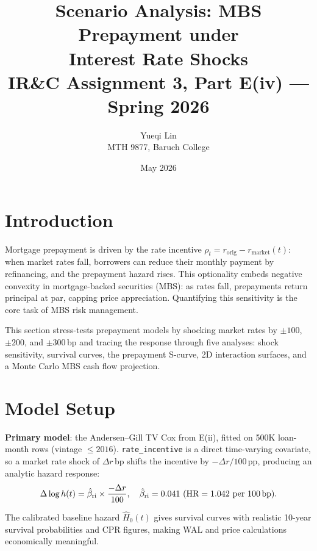\documentclass[11pt,a4paper]{article}
\title{\vspace{-1.5em}\textbf{Scenario Analysis: MBS Prepayment under\\
Interest Rate Shocks}\\[0.3em]
\large IR\&C Assignment 3, Part E(iv) --- Spring 2026}
\author{Yueqi Lin\\\small MTH 9877, Baruch College}
\date{May 2026}
\begin{document}
\maketitle
\vspace{-1.2em}

\section{Introduction}

Mortgage prepayment is driven by the rate incentive $\rho_t = r_{\text{orig}} - r_{\text{market}}(t)$:
when market rates fall, borrowers can reduce their monthly payment by refinancing, and the
prepayment hazard rises. This optionality embeds negative convexity in mortgage-backed
securities (MBS): as rates fall, prepayments return principal at par, capping price
appreciation. Quantifying this sensitivity is the core task of MBS risk management.

This section stress-tests prepayment models by shocking market rates by $\pm 100$, $\pm 200$,
and $\pm 300$\,bp and tracing the response through five analyses:
shock sensitivity, survival curves, the prepayment S-curve, 2D interaction surfaces,
and a Monte Carlo MBS cash flow projection.

\section{Model Setup}

\textbf{Primary model}: the Andersen--Gill TV Cox from E(ii), fitted on 500K loan-month rows
(vintage $\le 2016$). \texttt{rate\_incentive} is a direct time-varying covariate, so a
market rate shock of $\Delta r$\,bp shifts the incentive by $-\Delta r/100$\,pp, producing
an analytic hazard response:
\begin{equation}
    \Delta\log h(t) = \hat\beta_{\text{ri}} \times \frac{-\Delta r}{100},
    \quad \hat\beta_{\text{ri}} = 0.041 \text{ (HR} = 1.042 \text{ per 100\,bp)}.
\end{equation}

The calibrated baseline hazard $\hat{H}_0(t)$ gives survival curves with realistic
10-year survival probabilities and CPR figures, making WAL and price calculations
economically meaningful.
\end{document}
